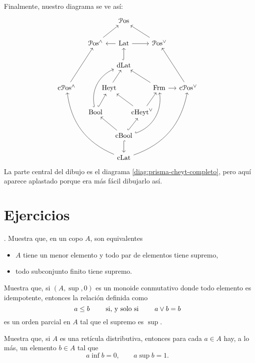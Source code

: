 Finalmente, nuestro diagrama se ve así:
\[
  \begin{tikzcd}[column sep = -1em]
      &[2em] & & \Pos & & &[2em] \\
      & \Pos^\wedge \ar[rru]
        && \Lat \ar[ll] \ar[rr]
        && \Pos^\sup  \ar[llu] & \\
      & & & \DLat \ar[u,hook] & & & \\
        \InfLat \ar[ruu]
        && \Heyt \ar[ur]
        &&& \Frm \ar[r] \ar[llu]
        & \SupLat \ar[luu] \\
      & \Bool \ar[rruu,hook,bend left=40] \ar[ur,hook]
      & & & \cHeyt \ar[ur] \ar[llu] & & \\
      & & & \CBA \ar[d,hook] \ar[ull] \ar[ur,hook]
                \ar[uurr,hook,bend right=40]
      & & & \\
      & & & \CLat \ar[rrruuu,bend right]
                  \ar[llluuu,bend left] & &
  \end{tikzcd}
\]
La parte central del dibujo es el diagrama
\eqref{diag:prisma-cheyt-completo}, pero aquí aparece aplastado porque
era más fácil dibujarlo así.



\section{Ejercicios}

\begin{exercise} \label{exe:equiv-1-def-sup-poset}.
  Muestra que, en un copo $A$, son equivalentes
  \begin{itemize}
    \item
      $A$ tiene un menor elemento y todo par de elementos tiene
      supremo,
    \item
      todo subconjunto finito tiene supremo.
  \end{itemize}
\end{exercise}

\begin{exercise}
  \label{exe:monoide-conmutativo-equiv-sup-pos}
  Muestra que, si $(A,\sup,0)$ es un monoide conmutativo donde todo
  elemento es idempotente, entonces la relación definida como
  \[
    a\leq b \qquad\text{ si, y solo si }\qquad a\vee b=b
  \]
  es un orden parcial en $A$ tal que el supremo es $\sup$.
\end{exercise}

\begin{exercise}\label{exe:dist-unicidad-complementos}
  Muestra que, si $A$ es una retícula distributiva, entonces para cada
  $a\in A$ hay, a lo más, un elemento $b\in A$ tal que
  \begin{equation}
    a\inf b = 0, \qquad a\sup b = 1.
  \end{equation}
\end{exercise}


